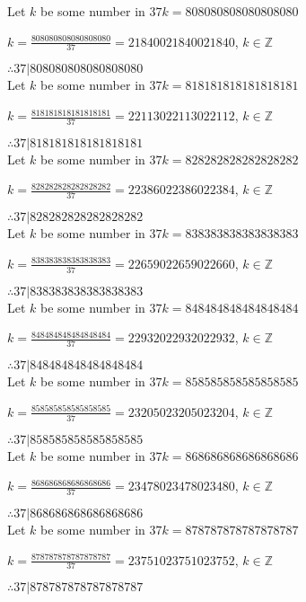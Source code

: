 \documentclass{article}
\begin{document}
Let $k$ be some number in $37k = 808080808080808080$

$k = \frac{808080808080808080}{37} = 21840021840021840$, $k \in \mathbb{Z}$

$ \therefore  37|808080808080808080 $ \\

Let $k$ be some number in $37k = 818181818181818181$

$k = \frac{818181818181818181}{37} = 22113022113022112$, $k \in \mathbb{Z}$

$ \therefore  37|818181818181818181 $ \\

Let $k$ be some number in $37k = 828282828282828282$

$k = \frac{828282828282828282}{37} = 22386022386022384$, $k \in \mathbb{Z}$

$ \therefore  37|828282828282828282 $ \\

Let $k$ be some number in $37k = 838383838383838383$

$k = \frac{838383838383838383}{37} = 22659022659022660$, $k \in \mathbb{Z}$

$ \therefore  37|838383838383838383 $ \\

Let $k$ be some number in $37k = 848484848484848484$

$k = \frac{848484848484848484}{37} = 22932022932022932$, $k \in \mathbb{Z}$

$ \therefore  37|848484848484848484 $ \\

Let $k$ be some number in $37k = 858585858585858585$

$k = \frac{858585858585858585}{37} = 23205023205023204$, $k \in \mathbb{Z}$

$ \therefore  37|858585858585858585 $ \\

Let $k$ be some number in $37k = 868686868686868686$

$k = \frac{868686868686868686}{37} = 23478023478023480$, $k \in \mathbb{Z}$

$ \therefore  37|868686868686868686 $ \\

Let $k$ be some number in $37k = 878787878787878787$

$k = \frac{878787878787878787}{37} = 23751023751023752$, $k \in \mathbb{Z}$

$ \therefore  37|878787878787878787 $ \\
\end{document}
